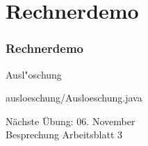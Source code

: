 \documentclass[9pt,german]{beamer}%
\begin{document}
\def\stitle{Rechnerdemo}
\section{\stitle}
\begin{frame}[fragile]%
  \frametitle{\stitle}%
\medskip

Ausl"oschung

{ausloeschung/Ausloeschung.java}
\end{frame}




\setcounter{exercise}{8}


\begin{frame}
\centering
\Huge{}
\vspace{2cm}

{\LARGE
N\"achste \"Ubung: 06. November\\
Besprechung Arbeitsblatt 3
}
\end{frame}


\end{document}
